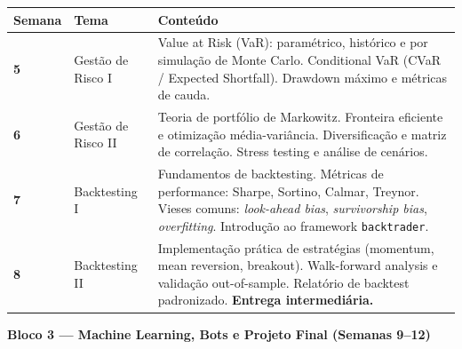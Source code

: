 \documentclass[12pt,a4paper]{article}
\begin{document}
\vspace{0.3cm}
\renewcommand{\arraystretch}{1.5}
\begin{tabularx}{\textwidth}{C{1.8cm} L{3.5cm} X}
    \toprule
    \textbf{Semana} & \textbf{Tema} & \textbf{Conteúdo} \\
    \midrule
    
    \textbf{5} & Gestão de Risco I &
    Value at Risk (VaR): paramétrico, histórico e por simulação de Monte Carlo. Conditional VaR (CVaR / Expected Shortfall). Drawdown máximo e métricas de cauda. \\
    
    \textbf{6} & Gestão de Risco II &
    Teoria de portfólio de Markowitz. Fronteira eficiente e otimização média-variância. Diversificação e matriz de correlação. Stress testing e análise de cenários. \\
    
    \textbf{7} & Backtesting I &
    Fundamentos de backtesting. Métricas de performance: Sharpe, Sortino, Calmar, Treynor. Vieses comuns: \textit{look-ahead bias}, \textit{survivorship bias}, \textit{overfitting}. Introdução ao framework \texttt{backtrader}. \\
    
    \textbf{8} & Backtesting II &
    Implementação prática de estratégias (momentum, mean reversion, breakout). Walk-forward analysis e validação out-of-sample. Relatório de backtest padronizado. \textbf{Entrega intermediária.} \\
    
    \bottomrule
\end{tabularx}

\vspace{0.8cm}

\noindent
\textbf{\textcolor{ufuazul}{ Bloco 3 — Machine Learning, Bots e Projeto Final (Semanas 9--12)}}
\end{document}
